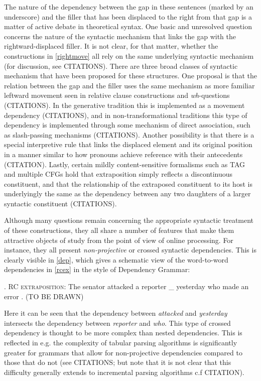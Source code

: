 \documentclass[12pt]{article}
\begin{document}
	The nature of the dependency between the gap in these sentences (marked by an underscore) and the filler that has been displaced to the right from that gap is a matter of active debate in theoretical syntax. One basic and unresolved question concerns the nature of the syntactic mechanism that links the gap with the rightward-displaced filler. It is not clear, for that matter, whether the constructions in \ref{rightmove} all rely on the same underlying syntactic mechanism (for discussion, see CITATIONS). There are three broad classes of syntactic mechanism that have been proposed for these structures. One proposal is that the relation between the gap and the filler uses the same mechanism as more familiar leftward movement seen in relative clause constructions and \textit{wh}-questions (CITATIONS). In the generative tradition this is implemented as a movement dependency (CITATIONS), and in non-transformational traditions this type of dependency is implemented through some mechanism of direct association, such as slash-passing mechanisms (CITATIONS).  Another possibility is that there is a special interpretive rule that links the displaced element and its original position in a manner similar to how pronouns achieve reference with their antecedents (CITATION). Lastly, certain mildly content-sensitive formalisms such as TAG and multiple CFGs hold that extraposition simply reflects a discontinuous constituent, and that the relationship of the extraposed constituent to its host is underlyingly the same as the dependency between any two daughters of a larger syntactic constituent (CITATIONS).  
	
	Although many questions remain concerning the appropriate syntactic treatment of these constructions, they all share a number of features that make them attractive objects of study from the point of view of online processing. For instance, they all present \textit{non-projective} or crossed syntactic dependencies. This is clearly visible in \ref{dep}, which gives a schematic view of the word-to-word dependencies in \ref{rcex} in the style of Dependency Grammar:
	
	   	\ex.	\label{rcex} \textsc{RC extraposition}: The senator attacked a reporter \_  yesterday  who made an error . (TO BE DRAWN)

	 Here it can be seen that the dependency between \textit{attacked} and \textit{yesterday} intersects the dependency between \textit{reporter} and \textit{who}. This type of crossed dependency is thought to be more complex than nested dependencies. This is reflected in e.g. the complexity of tabular parsing algorithms is significantly greater for grammars that allow for non-projective dependencies compared to those that do not (see CITATIONS; but note that it is not clear that this difficulty generally extends to incremental parsing algorithms c.f CITATION).
	 
\end{document}
